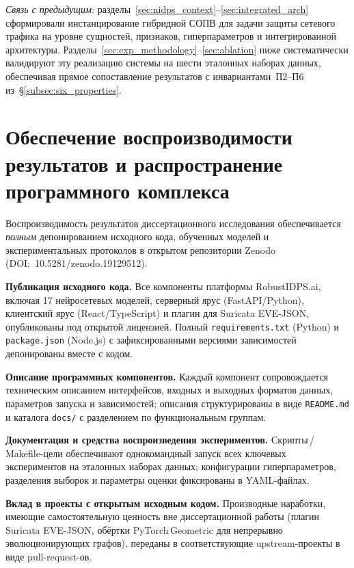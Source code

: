 \medskip
\noindent\emph{Связь с предыдущим:} разделы~\ref{sec:nidps_context}--\ref{sec:integrated_arch}
сформировали инстанцирование гибридной СОПВ для задачи защиты
сетевого трафика на уровне сущностей, признаков, гиперпараметров и
интегрированной архитектуры. Разделы~\ref{sec:exp_methodology}--\ref{sec:ablation}
ниже систематически валидируют эту реализацию системы на шести
эталонных наборах данных, обеспечивая прямое сопоставление
результатов с инвариантами~П2--П6 из~\S\ref{subsec:six_properties}.


\section{Обеспечение воспроизводимости результатов и распространение программного комплекса}
\label{sec:reproducibility}

Воспроизводимость результатов диссертационного исследования обеспечивается
\emph{полным} депонированием исходного кода, обученных моделей и
экспериментальных протоколов в открытом репозитории Zenodo
(DOI:~10.5281/zenodo.19129512).

\textbf{Публикация исходного кода.} Все компоненты платформы
RobustIDPS.ai, включая 17 нейросетевых моделей, серверный ярус
(FastAPI/Python), клиентский ярус (React/TypeScript) и плагин для
Suricata EVE-JSON, опубликованы под открытой лицензией. Полный
\texttt{requirements.txt} (Python) и \texttt{package.json} (Node.js)
с зафиксированными версиями зависимостей депонированы вместе с кодом.

\textbf{Описание программных компонентов.} Каждый компонент сопровождается
техническим описанием интерфейсов, входных и выходных форматов данных,
параметров запуска и зависимостей; описания структурированы в виде
\texttt{README.md} и каталога \texttt{docs/} с разделением по
функциональным группам.

\textbf{Документация и средства воспроизведения экспериментов.}
Скрипты\,/\,Makefile-цели обеспечивают однокомандный запуск всех
ключевых экспериментов на эталонных наборах данных; конфигурации
гиперпараметров, разделения выборок и параметры оценки фиксированы в
YAML-файлах.

\textbf{Вклад в проекты с открытым исходным кодом.} Производные
наработки, имеющие самостоятельную ценность вне диссертационной работы
(плагин Suricata EVE-JSON, обёртки PyTorch\,Geometric для непрерывно
эволюционирующих графов), переданы в соответствующие upstream-проекты
в виде pull-request-ов.
